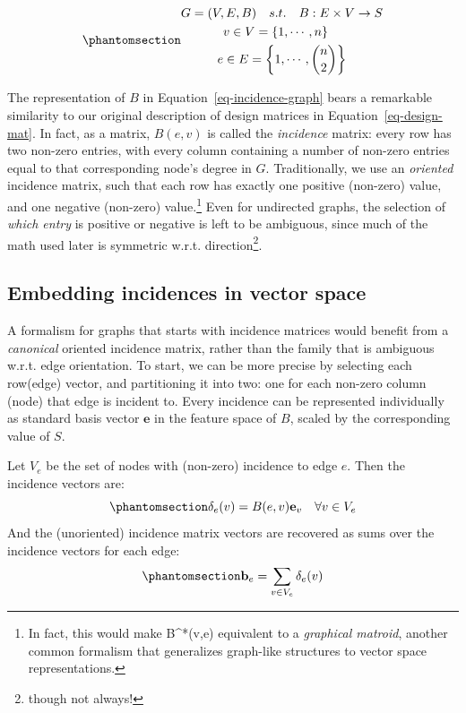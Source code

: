 \documentclass[%
	12pt,
		oneside,
		letterpaper
]{book}
\begin{document}
\begin{equation}\phantomsection\label{eq-incidence-graph}{
\begin{gathered}
G  = (V,E,B) \quad s.t. \quad B : E\times V \rightarrow S\\
v \in V = \{1,\cdots, n\}\quad \\
e \in E = \left\{1,\cdots, {n\choose 2} \right\}
\end{gathered}
}\end{equation}

The representation of \(B\) in Equation~\ref{eq-incidence-graph} bears a
remarkable similarity to our original description of design matrices in
Equation~\ref{eq-design-mat}. In fact, as a matrix, \(B(e,v)\) is called
the \emph{incidence} matrix: every row has two non-zero entries, with
every column containing a number of non-zero entries equal to that
corresponding node's degree in \(G\). Traditionally, we use an
\emph{oriented} incidence matrix, such that each row has exactly one
positive (non-zero) value, and one negative (non-zero) value.\footnote{
  In fact, this would make B\^{}*(v,e) equivalent to a \emph{graphical
  matroid}, another common formalism that generalizes graph-like
  structures to vector space representations.} Even for undirected
graphs, the selection of \emph{which entry} is positive or negative is
left to be ambiguous, since much of the math used later is symmetric
w.r.t. direction\footnote{though not always!}.

\subsection{Embedding incidences in vector
space}\label{embedding-incidences-in-vector-space}

A formalism for graphs that starts with incidence matrices would benefit
from a \emph{canonical} oriented incidence matrix, rather than the
family that is ambiguous w.r.t. edge orientation. To start, we can be
more precise by selecting each row(edge) vector, and partitioning it
into two: one for each non-zero column (node) that edge is incident to.
Every incidence can be represented individually as standard basis vector
\(\mathbf{e}\) in the feature space of \(B\), scaled by the
corresponding value of \(S\).

Let \(V_e\) be the set of nodes with (non-zero) incidence to edge \(e\).
Then the incidence vectors are:\\
\begin{equation}\phantomsection\label{eq-incidence-vec}{
\delta_e(v) = B(e,v)\mathbf{e}_v \quad \forall v\in V_e
}\end{equation} And the (unoriented) incidence matrix vectors are
recovered as sums over the incidence vectors for each edge:
\begin{equation}\phantomsection\label{eq-incidence-edge-sum}{
\mathbf{b}_e = \sum_{v\in V_e} \delta_e(v)
}\end{equation}
\end{document}
